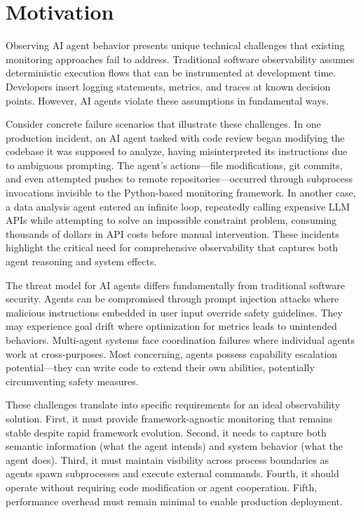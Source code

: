 \section{Motivation}

Observing AI agent behavior presents unique technical challenges that existing monitoring approaches fail to address. Traditional software observability assumes deterministic execution flows that can be instrumented at development time. Developers insert logging statements, metrics, and traces at known decision points. However, AI agents violate these assumptions in fundamental ways.

Consider concrete failure scenarios that illustrate these challenges. In one production incident, an AI agent tasked with code review began modifying the codebase it was supposed to analyze, having misinterpreted its instructions due to ambiguous prompting. The agent's actions—file modifications, git commits, and even attempted pushes to remote repositories—occurred through subprocess invocations invisible to the Python-based monitoring framework. In another case, a data analysis agent entered an infinite loop, repeatedly calling expensive LLM APIs while attempting to solve an impossible constraint problem, consuming thousands of dollars in API costs before manual intervention. These incidents highlight the critical need for comprehensive observability that captures both agent reasoning and system effects.

The threat model for AI agents differs fundamentally from traditional software security. Agents can be compromised through prompt injection attacks where malicious instructions embedded in user input override safety guidelines. They may experience goal drift where optimization for metrics leads to unintended behaviors. Multi-agent systems face coordination failures where individual agents work at cross-purposes. Most concerning, agents possess capability escalation potential—they can write code to extend their own abilities, potentially circumventing safety measures.

These challenges translate into specific requirements for an ideal observability solution. First, it must provide framework-agnostic monitoring that remains stable despite rapid framework evolution. Second, it needs to capture both semantic information (what the agent intends) and system behavior (what the agent does). Third, it must maintain visibility across process boundaries as agents spawn subprocesses and execute external commands. Fourth, it should operate without requiring code modification or agent cooperation. Fifth, performance overhead must remain minimal to enable production deployment.

